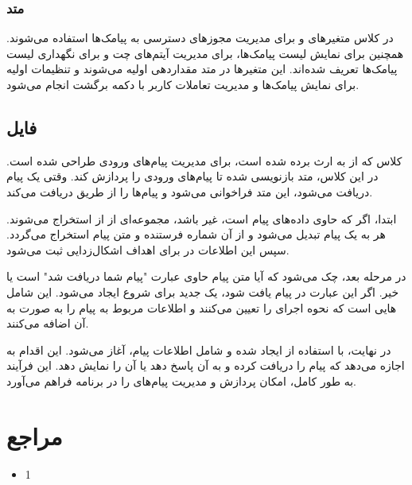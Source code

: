 \documentclass{report}
\begin{document}
\subsection{متد
}
در کلاس
 متغیرهای
  و 
  برای مدیریت مجوزهای دسترسی به پیامک‌ها استفاده می‌شوند. همچنین 
  برای نمایش لیست پیامک‌ها،
   برای مدیریت آیتم‌های چت و 
   برای نگهداری لیست پیامک‌ها تعریف شده‌اند. این متغیرها در متد
    مقداردهی اولیه می‌شوند و تنظیمات اولیه برای نمایش پیامک‌ها و مدیریت تعاملات کاربر با دکمه برگشت انجام می‌شود.
    
    
\section{فایل
}  
کلاس
 که از
  به ارث برده شده است، برای مدیریت پیام‌های ورودی
   طراحی شده است. در این کلاس، متد
    بازنویسی شده تا پیام‌های
     ورودی را پردازش کند. وقتی یک پیام 
     دریافت می‌شود، این متد فراخوانی می‌شود و پیام‌ها را از طریق
      دریافت می‌کند.

ابتدا، اگر
  که حاوی داده‌های پیام است، غیر 
   باشد، مجموعه‌ای از
     از
      استخراج می‌شوند. هر
       به یک پیام 
       تبدیل می‌شود و از آن شماره فرستنده و متن پیام استخراج می‌گردد. سپس این اطلاعات در
        برای اهداف اشکال‌زدایی ثبت می‌شود.

در مرحله بعد، چک می‌شود که آیا متن پیام حاوی عبارت "پیام شما دریافت شد" است یا خیر. اگر این عبارت در پیام یافت شود، یک
 جدید برای شروع
  ایجاد می‌شود. این
   شامل
    هایی است که نحوه اجرای
     را تعیین می‌کنند و اطلاعات مربوط به پیام را به صورت
      به آن اضافه می‌کنند.

در نهایت،
 با استفاده از 
 ایجاد شده و شامل اطلاعات پیام، آغاز می‌شود. این اقدام به 
 اجازه می‌دهد که پیام را دریافت کرده و به آن پاسخ دهد یا آن را نمایش دهد. این فرآیند به طور کامل، امکان پردازش و مدیریت پیام‌های 
 را در برنامه فراهم می‌آورد.
\chapter {مراجع}
\begin{itemize}
	\item 1
\end{itemize}
\end{document}
